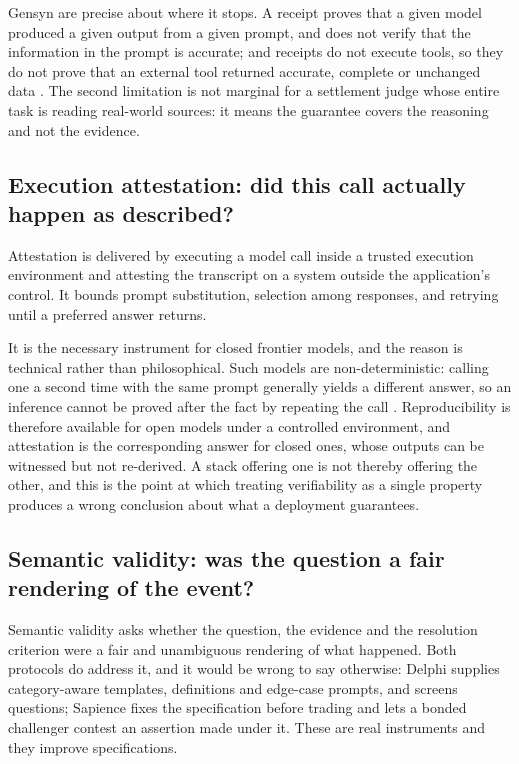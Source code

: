 Gensyn are precise about where it stops. A receipt proves that a given model produced a
given output from a given prompt, and does not verify that the information in the prompt is
accurate; and receipts do not execute tools, so they do not prove that an external tool
returned accurate, complete or unchanged data \cite{gensyn2026receipts}. The second
limitation is not marginal for a settlement judge whose entire task is reading real-world
sources: it means the guarantee covers the reasoning and not the evidence.

\subsection*{Execution attestation: did this call actually happen as described?}

Attestation is delivered by executing a model call inside a trusted execution environment
and attesting the transcript on a system outside the application's control. It
bounds prompt substitution, selection among responses, and retrying until a preferred answer
returns.

It is the necessary instrument for closed frontier models, and the reason is technical
rather than philosophical. Such models are non-deterministic: calling one a second time with
the same prompt generally yields a different answer, so an inference cannot be proved after
the fact by repeating the call \cite{truebit2026orchestration}. Reproducibility is therefore
available for open models under a controlled environment, and attestation is the
corresponding answer for closed ones, whose outputs can be witnessed but not re-derived. A
stack offering one is not thereby offering the other, and this is the point at which
treating verifiability as a single property produces a wrong conclusion about what a
deployment guarantees.

\subsection*{Semantic validity: was the question a fair rendering of the event?}

Semantic validity asks whether the question, the evidence and the resolution criterion were
a fair and unambiguous rendering of what happened. Both protocols do address it, and it
would be wrong to say otherwise: Delphi supplies category-aware templates, definitions and
edge-case prompts, and screens questions; Sapience fixes the specification before trading
and lets a bonded challenger contest an assertion made under it. These are real instruments
and they improve specifications.

